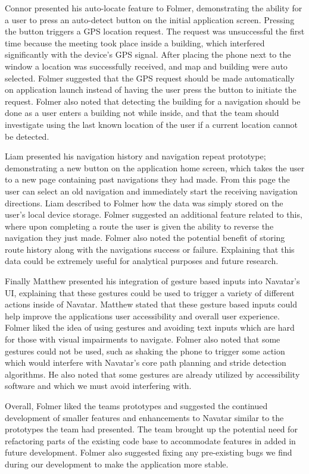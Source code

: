 \documentclass{scrreprt}
\begin{document}
Connor presented his auto-locate feature to Folmer, demonstrating the ability for a user to press an auto-detect button on the initial application screen. Pressing the button triggers a GPS location request. The request was unsuccessful the first time because the meeting took place inside a building, which interfered significantly with the device’s GPS signal. After placing the phone next to the window a location was successfully received, and map and building were auto selected. Folmer suggested that the GPS request should be made automatically on application launch instead of having the user press the button to initiate the request. Folmer also noted that detecting the building for a navigation should be done as a user enters a building not while inside, and that the team should investigate using the last known location of the user if a current location cannot be detected.

	Liam presented his navigation history and navigation repeat prototype; demonstrating a new button on the application home screen, which takes the user to a new page containing past navigations they had made. From this page the user can select an old navigation and immediately start the receiving navigation directions. Liam described to Folmer how the data was simply stored on the user's local device storage. Folmer suggested an additional feature related to this, where upon completing a route the user is given the ability to reverse the navigation they just made. Folmer also noted the potential benefit of storing route history along with the navigations success or failure. Explaining that this data could be extremely useful for analytical purposes and future research.
	
	Finally Matthew presented his integration of gesture based inputs into Navatar’s UI, explaining that these gestures could be used to trigger a variety of different actions inside of Navatar. Matthew stated that these gesture based inputs could help improve the applications user accessibility and overall user experience. Folmer liked the idea of using gestures and avoiding text inputs which are hard for those with visual impairments to navigate. Folmer also noted that some gestures could not be used, such as shaking the phone to trigger some action which would interfere with Navatar’s core path planning and stride detection algorithms. He also noted that some gestures are already utilized by accessibility software and which we must avoid interfering with.
	
	Overall, Folmer liked the teams prototypes and suggested the continued development of smaller features and enhancements to Navatar similar to the prototypes the team had presented. The team brought up the potential need for refactoring parts of the existing code base to accommodate features in added in future development. Folmer also suggested fixing any pre-existing bugs we find during our development to make the application more stable.
\end{document}
